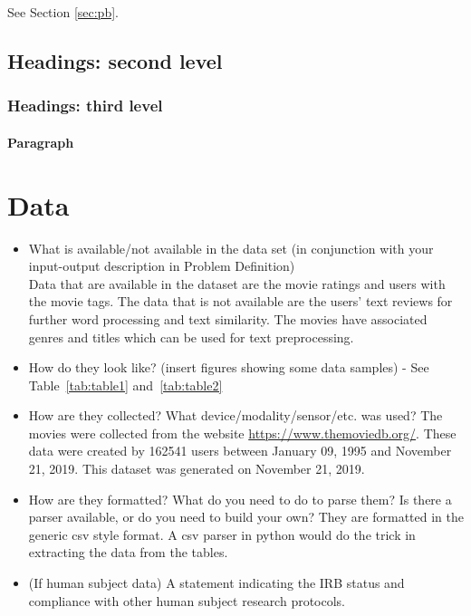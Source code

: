\documentclass{article}
\begin{document}
See Section \ref{sec:pb}.

\subsection{Headings: second level}


\subsubsection{Headings: third level}


\paragraph{Paragraph}


\section{Data}
\label{sec:Data}


\begin{itemize}
\item What is available/not available in the data set (in conjunction with your input-output description in Problem Definition) \\
Data that are available in the dataset are the movie ratings and users with the movie tags. The data that is not available are the users' text reviews for further
word processing and text similarity. The movies have associated genres and titles which can be used for text preprocessing.
\item How do they look like? (insert figures showing some data samples) - See Table~\ref{tab:table1} and~\ref{tab:table2}
\item How are they collected? What device/modality/sensor/etc. was used?
The movies were collected from the website \url{https://www.themoviedb.org/}. These data were created by 162541 users between January 09, 1995 and November 21, 2019. This dataset was generated on November 21, 2019.
\item How are they formatted? What do you need to do to parse them? Is there a parser available, or do you need to build your own?
They are formatted in the generic csv style format. A csv parser in python would do the trick in extracting the data from the tables. 
\item (If human subject data) A statement indicating the IRB status and compliance with other human subject research protocols.
\end{itemize}
\end{document}
